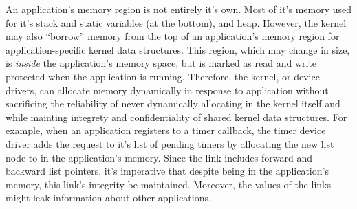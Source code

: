 \begin{enumerate}
\end{enumerate}

An application's memory region is not entirely it's own. Most of it's memory
used for it's stack and static variables (at the bottom), and heap. However, the
kernel may also ``borrow'' memory from the top of an application's memory region
for application-specific kernel data structures. This region, which may change
in size, is \emph{inside} the application's memory space, but is marked as read
and write protected when the application is running. Therefore, the kernel, or device
drivers, can allocate memory dynamically in response to application without
sacrificing the reliability of never dynamically allocating in the kernel itself
and while mainting integrety and confidentiality of shared kernel data
structures. For example, when an application registers to a timer callback, the
timer device driver adds the request to it's list of pending timers by
allocating the new list node to in the application's memory. Since the link includes
forward and backward list pointers, it's imperative that despite being in the
application's memory, this link's integrity be maintained. Moreover, the values
of the links might leak information about other applications.


